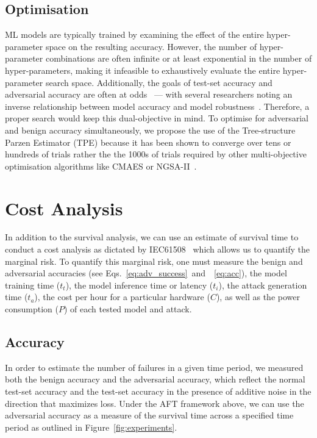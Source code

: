\documentclass[conference]{IEEEtran}
\begin{document}
{\subsection{Optimisation}
\label{optimisation}

ML models are typically trained by examining the effect of the entire hyper-parameter space on the resulting accuracy. However, the number of hyper-parameter combinations are often infinite or at least exponential in the number of hyper-parameters,
making it infeasible to exhaustively evaluate the entire hyper-parameter search space. Additionally, the goals of test-set accuracy and adversarial accuracy are often at odds~\cite{carlini_towards_2017} --- with several researchers noting an inverse relationship between model accuracy and model robustness~\cite{carlini_towards_2017,meyers,dohmatob_generalized_2019}. Therefore, a proper search would keep this dual-objective in mind.
To optimise for adversarial and benign accuracy simultaneously, we propose the use of the Tree-structure Parzen Estimator (TPE) because it has been shown to converge  over tens or hundreds of trials rather the the 1000s of trials required by other multi-objective optimisation algorithms like CMAES or NGSA-II~\cite{ozaki2020multiobjective,optuna,tpe_params}.

\section{Cost Analysis}
\label{cost}

In addition to the survival analysis, we can use an estimate of survival time to conduct a cost analysis as dictated by IEC61508~\cite{IEC61508} which allows us to quantify the marginal risk. To quantify this marginal risk, one must measure the benign and adversarial accuracies (see Eqs.~\ref{eq:adv_success}~and~~\ref{eq:acc}), the model training time ($t_{t}$), the model inference time or latency ($t_{i}$), the attack generation time ($t_{a}$), the cost per hour for a particular hardware ($C$), as well as the power consumption ($P$) of each tested model and attack. 


\subsection{Accuracy}

In order to estimate the number of failures in a given time period, we measured both the benign accuracy and the adversarial accuracy, which reflect the normal test-set accuracy and the test-set accuracy in the presence of additive noise in the direction that maximizes loss. Under the AFT framework above, we can use the adversarial accuracy as a measure of the survival time across a specified time period as outlined in Figure~\ref{fig:experiments}.


}
\end{document}
